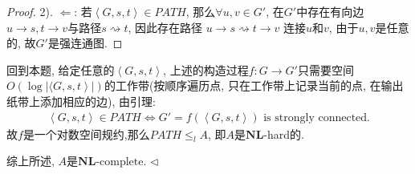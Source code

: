 \documentclass[11pt]{article}
\newcommand{\NL}{ \mathbf{NL}}
\newcommand{\NLC}{\mathbf{NL}\text{-complete}}
\newcommand{\1}{\mathbf{1}}
\newenvironment{answer}[1][Answer]{\begin{trivlist}
\item[\hskip \labelsep{\bfseries\itshape#1.}\hskip \labelsep]}{\hfill$\lhd$\end{trivlist}}
\begin{document}
\begin{answer}
\begin{proof}
        2). $\Leftarrow$: 若$\left\langle G,s,t \right\rangle \in \textit{PATH}$, 那么$\forall u, v \in G'$, 在$G'$中存在有向边$u \rightarrow s, t \rightarrow v$与路径$s \rightsquigarrow t$, 因此存在路径
            $u \rightarrow s \rightsquigarrow t \rightarrow v$
        连接$u$和$v$, 由于$u,v$是任意的, 故$G'$是强连通图.
    \end{proof}
    回到本题, 给定任意的$\left\langle G,s,t \right\rangle$, 上述的构造过程$f: G\rightarrow G'$只需要空间$O(\log\left\lvert\langle G,s,t \right\rangle\rvert)$的工作带(按顺序遍历点, 只在工作带上记录当前的点, 在输出纸带上添加相应的边), 由引理:
    \begin{align*}
        \left\langle G,s,t \right\rangle \in \textit{PATH} \iff G' = f\left(\left\langle G,s,t \right\rangle\right) \text{ is strongly connected}.
    \end{align*}
    故$f$是一个对数空间规约,那么$\textit{PATH} \leq_l A$, 即$A$是$\NL$-hard的. 
    
    综上所述, $A$是$\NLC$.
\end{answer} 
\end{document}

